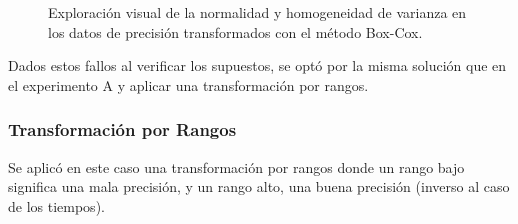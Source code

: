 \begin{figure}[H]
\centering
\caption{Exploración visual de la normalidad y homogeneidad de varianza en los datos de precisión transformados con el método Box-Cox.}
\label{fig:transformacion-bc-p}
\end{figure}

Dados estos fallos al verificar los supuestos, se optó por la misma solución que en el experimento A y aplicar una transformación por rangos.


\subsubsection{Transformación por Rangos}

Se aplicó en este caso una transformación por rangos donde un rango bajo significa una mala precisión, y un rango alto, una buena precisión (inverso al caso de los tiempos).

